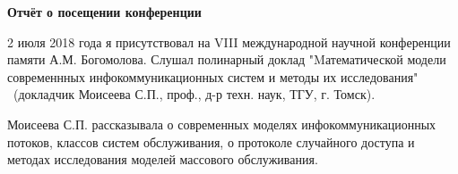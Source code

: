 \documentclass{article}
\begin{document}
\pagestyle{empty}
\begin{center}
\textbf{Отчёт о посещении конференции}
\end{center}
\par 2 июля 2018 года я присутствовал на VIII 
международной научной конференции памяти
А.М. Богомолова. Слушал полинарный доклад 
"Mатематической модели современнных
инфокоммуникационных систем и методы их исследования" 
\ (докладчик Моисеева С.П.,
проф., д-р техн. наук, ТГУ, г. Томск).
\par Моисеева С.П. рассказывала о современных моделях 
инфокоммуникационных потоков,
классов систем обслуживания, о протоколе случайного 
доступа и методах исследования 
моделей массового обслуживания.
\end{document}

